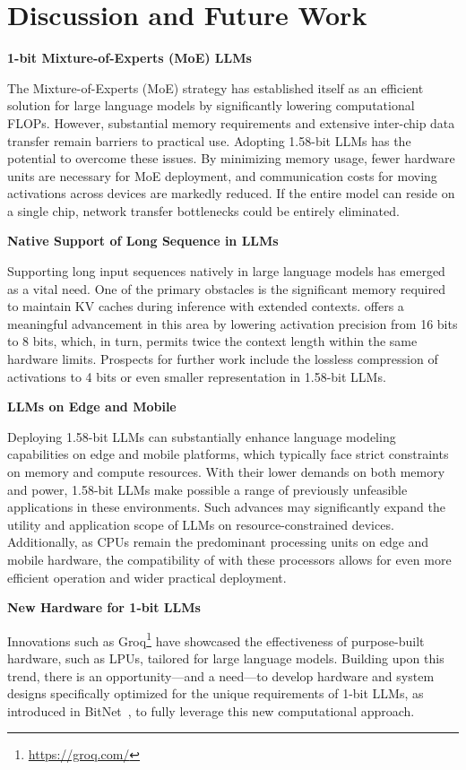 \section{Discussion and Future Work}

\textbf{1-bit Mixture-of-Experts (MoE) LLMs}

The Mixture-of-Experts (MoE) strategy has established itself as an efficient solution for large language models by significantly lowering computational FLOPs. However, substantial memory requirements and extensive inter-chip data transfer remain barriers to practical use. Adopting 1.58-bit LLMs has the potential to overcome these issues. By minimizing memory usage, fewer hardware units are necessary for MoE deployment, and communication costs for moving activations across devices are markedly reduced. If the entire model can reside on a single chip, network transfer bottlenecks could be entirely eliminated.

\textbf{Native Support of Long Sequence in LLMs}

Supporting long input sequences natively in large language models has emerged as a vital need. One of the primary obstacles is the significant memory required to maintain KV caches during inference with extended contexts.  offers a meaningful advancement in this area by lowering activation precision from 16 bits to 8 bits, which, in turn, permits twice the context length within the same hardware limits. Prospects for further work include the lossless compression of activations to 4 bits or even smaller representation in 1.58-bit LLMs.

\textbf{LLMs on Edge and Mobile}

Deploying 1.58-bit LLMs can substantially enhance language modeling capabilities on edge and mobile platforms, which typically face strict constraints on memory and compute resources. With their lower demands on both memory and power, 1.58-bit LLMs make possible a range of previously unfeasible applications in these environments. Such advances may significantly expand the utility and application scope of LLMs on resource-constrained devices. Additionally, as CPUs remain the predominant processing units on edge and mobile hardware, the compatibility of  with these processors allows for even more efficient operation and wider practical deployment.

\textbf{New Hardware for 1-bit LLMs}

Innovations such as Groq\footnote{\url{https://groq.com/}} have showcased the effectiveness of purpose-built hardware, such as LPUs, tailored for large language models. Building upon this trend, there is an opportunity—and a need—to develop hardware and system designs specifically optimized for the unique requirements of 1-bit LLMs, as introduced in BitNet~\cite{bitnet}, to fully leverage this new computational approach.

